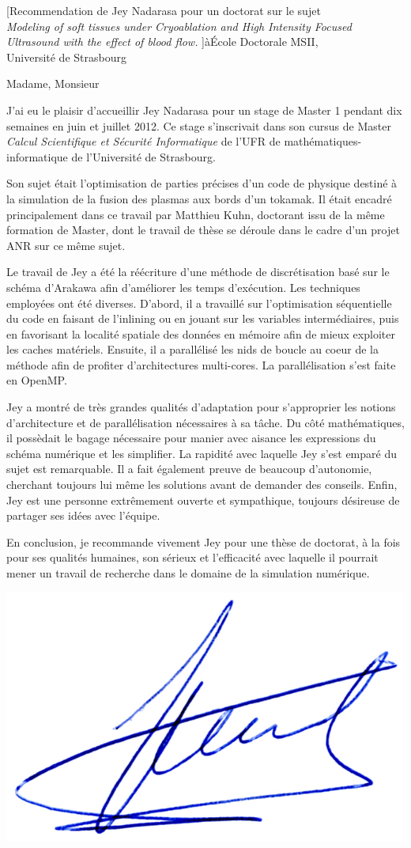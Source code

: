 \documentclass[a4paper,10pt]{article}
\begin{document}

\begin{letter}[Recommendation de Jey Nadarasa pour un doctorat sur le sujet\\%
{\it Modeling of soft tissues under Cryoablation and High Intensity Focused Ultrasound with the effect of blood flow.}%
]{à}{\'Ecole Doctorale MSII,\\Université de Strasbourg}

\vspace{-13mm}
Madame, Monsieur

J'ai eu le plaisir d'accueillir Jey Nadarasa pour un stage de Master 1 pendant
dix semaines en juin et juillet 2012. Ce stage s'inscrivait dans son cursus de
Master \textit{Calcul Scientifique et Sécurité Informatique} de l'UFR de 
mathématiques-informatique de l'Université de Strasbourg.

Son sujet était l'optimisation de parties précises d'un code de physique destiné
à la simulation de la fusion des plasmas aux bords d'un tokamak. Il était encadré
principalement dans ce travail par Matthieu Kuhn, doctorant issu de la même
formation de Master, dont le travail de thèse se déroule dans le cadre d'un projet
ANR sur ce même sujet.

Le travail de Jey a été la réécriture d'une méthode de discrétisation basé sur 
le schéma d'Arakawa afin d'améliorer les temps d'exécution. Les techniques employées
ont été diverses. D'abord, il a travaillé sur l'optimisation séquentielle du code en faisant de 
l'inlining ou en jouant sur les variables intermédiaires, puis en favorisant la 
localité spatiale des données en mémoire afin de mieux exploiter les caches matériels.
Ensuite, il a parallélisé les nids de boucle au coeur de la méthode afin 
de profiter d'architectures multi-cores. La parallélisation s'est faite en OpenMP.


Jey a montré de très grandes qualités d'adaptation pour s'approprier les notions
d'architecture et de parallélisation nécessaires à sa tâche. Du côté mathématiques,
il possèdait le bagage nécessaire pour manier avec aisance les expressions du schéma
numérique et les simplifier. La rapidité avec laquelle Jey s'est emparé du sujet est
remarquable. Il a fait également preuve de beaucoup d'autonomie, cherchant toujours
lui même les solutions avant de demander des conseils. Enfin, Jey est une personne
extrêmement ouverte et sympathique, toujours désireuse de partager ses idées avec
l'équipe.

En conclusion, je recommande vivement Jey pour une thèse de doctorat, à la 
fois pour ses qualités humaines, son sérieux et l'efficacité avec laquelle il pourrait
mener un travail de recherche dans le domaine de la simulation numérique. 


\end{letter}
\begin{flushright}
\includegraphics[width=.20\textwidth]{signgenaud.jpg}
\end{flushright}
%
%
\end{document}

